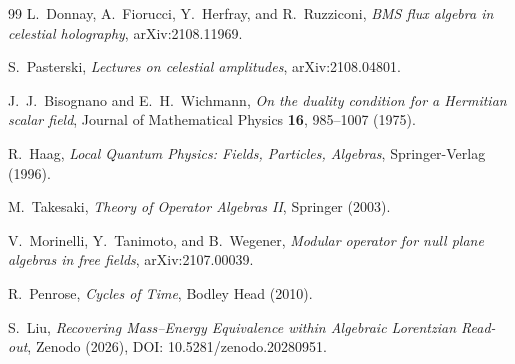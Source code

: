 \documentclass[12pt,a4paper]{article}
\theoremstyle{definition}
\theoremstyle{remark}
\begin{document}
\begin{thebibliography}{99}
L.~Donnay, A.~Fiorucci, Y.~Herfray, and R.~Ruzziconi, \emph{BMS flux algebra in celestial holography}, arXiv:2108.11969.

S.~Pasterski, \emph{Lectures on celestial amplitudes}, arXiv:2108.04801.

J.~J.~Bisognano and E.~H.~Wichmann, \emph{On the duality condition for a Hermitian scalar field}, Journal of Mathematical Physics \textbf{16}, 985--1007 (1975).

R.~Haag, \emph{Local Quantum Physics: Fields, Particles, Algebras}, Springer-Verlag (1996).

M.~Takesaki, \emph{Theory of Operator Algebras II}, Springer (2003).

V.~Morinelli, Y.~Tanimoto, and B.~Wegener, \emph{Modular operator for null plane algebras in free fields}, arXiv:2107.00039.

R.~Penrose, \emph{Cycles of Time}, Bodley Head (2010).

S.~Liu, \emph{Recovering Mass--Energy Equivalence within Algebraic Lorentzian Read-out}, Zenodo (2026), DOI: 10.5281/zenodo.20280951.

\end{thebibliography}
\end{document}
